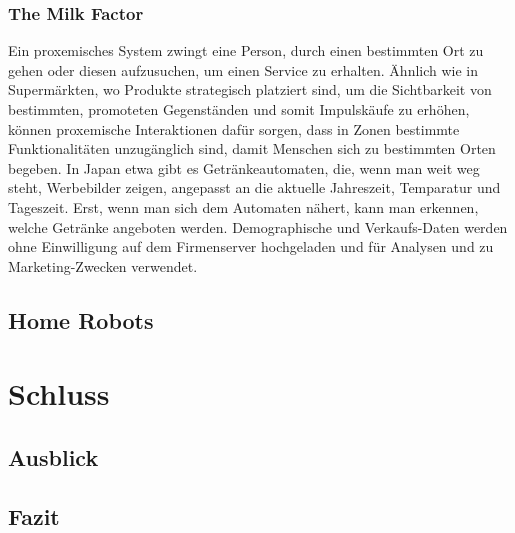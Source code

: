 \documentclass[a4paper]{article}
\begin{document}
\subsubsection{The Milk Factor}
\label{sssec:the_milk_factor}
Ein proxemisches System zwingt eine Person, durch einen bestimmten Ort zu gehen oder diesen aufzusuchen, um einen Service zu erhalten.\newline
Ähnlich wie in Supermärkten, wo Produkte strategisch platziert sind, um die Sichtbarkeit von bestimmten, promoteten Gegenständen und somit Impulskäufe zu erhöhen, können proxemische Interaktionen dafür sorgen, dass in Zonen bestimmte Funktionalitäten unzugänglich sind, damit Menschen sich zu bestimmten Orten begeben.\newline
In Japan etwa gibt es Getränkeautomaten, die, wenn man weit weg steht, Werbebilder zeigen, angepasst an die aktuelle Jahreszeit, Temparatur und Tageszeit. Erst, wenn man sich dem Automaten nähert, kann man erkennen, welche Getränke angeboten werden. Demographische und Verkaufs-Daten werden ohne Einwilligung auf dem Firmenserver hochgeladen und für Analysen und zu Marketing-Zwecken verwendet.

\subsection{Home Robots}
\label{sub:home_robots}

\section{Schluss}
\label{sec:schluss}

\subsection{Ausblick}
\label{sub:ausblick}

\subsection{Fazit}
\label{sub:fazit}


\newpage


\printbibliography

%

%
\end{document}
